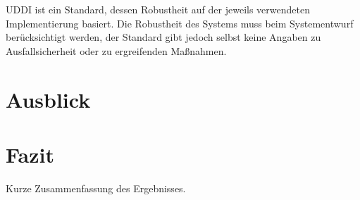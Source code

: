 \documentclass[conference,compsoc]{IEEEtran}
\begin{document}
UDDI ist ein Standard, dessen Robustheit auf der jeweils verwendeten Implementierung basiert. Die Robustheit des Systems muss beim Systementwurf berücksichtigt werden, der Standard gibt jedoch selbst keine Angaben zu Ausfallsicherheit oder zu ergreifenden Maßnahmen.

\section{Ausblick}



\section{Fazit}
Kurze Zusammenfassung des Ergebnisses.


%
%



%
%
\end{document}
